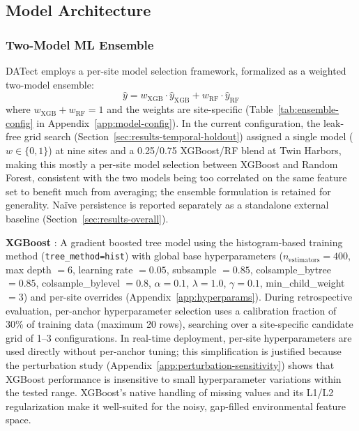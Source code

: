 \documentclass[toxins,article,submit,moreauthors]{Definitions/mdpi}
\begin{document}
\subsection{Model Architecture}
\label{sec:model-selection}

\subsubsection{Two-Model ML Ensemble}

DATect employs a per-site model selection framework, formalized as a weighted two-model ensemble:
\begin{equation}
\hat{y} = w_{\text{XGB}} \cdot \hat{y}_{\text{XGB}} + w_{\text{RF}} \cdot \hat{y}_{\text{RF}}
\label{eq:ensemble}
\end{equation}
where $w_{\text{XGB}} + w_{\text{RF}} = 1$ and the weights are site-specific (Table~\ref{tab:ensemble-config} in Appendix~\ref{app:model-config}). In the current configuration, the leak-free grid search (Section~\ref{sec:results-temporal-holdout}) assigned a single model ($w \in \{0, 1\}$) at nine sites and a 0.25/0.75 XGBoost/RF blend at Twin Harbors, making this mostly a per-site model selection between XGBoost and Random Forest, consistent with the two models being too correlated on the same feature set to benefit much from averaging; the ensemble formulation is retained for generality. Na\"ive persistence is reported separately as a standalone external baseline (Section~\ref{sec:results-overall}).

\textbf{XGBoost} \cite{Chen2016}: A gradient boosted tree model using the histogram-based training method (\texttt{tree\_method=hist}) with global base hyperparameters ($n_{\text{estimators}} = 400$, max depth $= 6$, learning rate $= 0.05$, subsample $= 0.85$, colsample\_bytree $= 0.85$, colsample\_bylevel $= 0.8$, $\alpha = 0.1$, $\lambda = 1.0$, $\gamma = 0.1$, min\_child\_weight $= 3$) and per-site overrides (Appendix~\ref{app:hyperparams}). During retrospective evaluation, per-anchor hyperparameter selection uses a calibration fraction of 30\% of training data (maximum 20 rows), searching over a site-specific candidate grid of 1--3 configurations. In real-time deployment, per-site hyperparameters are used directly without per-anchor tuning; this simplification is justified because the perturbation study (Appendix~\ref{app:perturbation-sensitivity}) shows that XGBoost performance is insensitive to small hyperparameter variations within the tested range. XGBoost's native handling of missing values and its L1/L2 regularization make it well-suited for the noisy, gap-filled environmental feature space.
\end{document}
